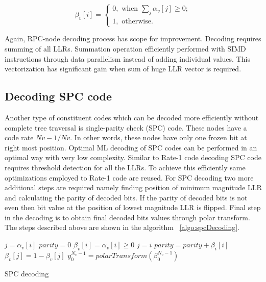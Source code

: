 \begin{equation*}
 \beta_{v}[i] = \begin{cases}
				0, \text{ when $\sum_{j} \alpha_{v}[j] \geq 0 ;$}  \\
				1, \text{ otherwise.}
				\end{cases}
\end{equation*}

Again, RPC-node decoding process has scope for improvement. Decoding requires summing of all LLRs. Summation operation efficiently performed with SIMD instructions through data parallelism instead of adding individual values. This vectorization has significant gain when sum of huge LLR vector is required.

\subsection{Decoding SPC code}
Another type of constituent codes which can be decoded more efficiently without complete tree traversal is single-parity check (SPC) code. These nodes have a code rate $Nv-1/Nv$. In other words, these nodes have only one frozen bit at right most position. Optimal ML decoding of SPC codes can be performed in an optimal way with very low complexity. Similar to Rate-1 code decoding SPC code requires threshold detection for all the LLRs. To achieve this efficiently same optimizations employed to Rate-1 code are reused. For SPC decoding two more additional steps are required namely finding position of minimum magnitude LLR and calculating the parity of decoded bits. If the parity of decoded bits is not even then bit value at the position of lowest magnitude LLR is flipped. Final step in the decoding is to obtain final decoded bits values through polar transform. The steps described above are shown in the algorithm ~\ref{algo:spcDecoding}.

\IncMargin{1.5em}
\begin{algorithm}[]
	 {
			$j = \alpha_{v}[i]$ \;
			$parity = 0$ \;
			 {
				$\beta_{v}[i] = \alpha_{v}[i] \ge 0$\;
				 {
					$j = i$ \;
				}
				$parity = parity + \beta_{\textit{i}}[i]$ \;
			}
		 {
			$\beta_{v}[j] = 1 - \beta_{v}[j]$\;
		}
		$y_{0}^{N_v-1} = polarTransform(\beta_{0}^{N_v-1})$ \;
		}
	\caption{SPC decoding}
	\label{algo:spcDecoding}
\end{algorithm}
\DecMargin{1.5em}


